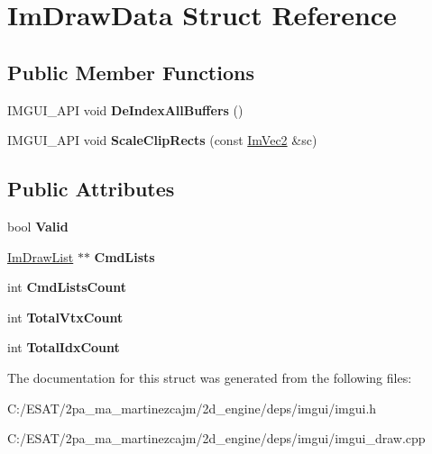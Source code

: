 \hypertarget{struct_im_draw_data}{}\section{Im\+Draw\+Data Struct Reference}
\label{struct_im_draw_data}
\subsection*{Public Member Functions}
\begin{DoxyCompactItemize}
\item 
\mbox{\label{struct_im_draw_data_a88ae746e958b79ee527fe94dee29d57c}} 
I\+M\+G\+U\+I\+\_\+\+A\+PI void {\bfseries De\+Index\+All\+Buffers} ()
\item 
\mbox{\label{struct_im_draw_data_abbfb7f8351b436da654f93b6f103f0e2}} 
I\+M\+G\+U\+I\+\_\+\+A\+PI void {\bfseries Scale\+Clip\+Rects} (const \hyperlink{struct_im_vec2}{Im\+Vec2} \&sc)
\end{DoxyCompactItemize}
\subsection*{Public Attributes}
\begin{DoxyCompactItemize}
\item 
\mbox{\label{struct_im_draw_data_ad01ab9ce5e8843b7860ccbb3eb9a6554}} 
bool {\bfseries Valid}
\item 
\mbox{\label{struct_im_draw_data_a9e93fe7e620eb2e9f61e3b689d617edc}} 
\hyperlink{struct_im_draw_list}{Im\+Draw\+List} $\ast$$\ast$ {\bfseries Cmd\+Lists}
\item 
\mbox{\label{struct_im_draw_data_adc0bbc2881c15f78bdabe51d82582f4e}} 
int {\bfseries Cmd\+Lists\+Count}
\item 
\mbox{\label{struct_im_draw_data_af0035b52cdf91932b25eaf2da853965a}} 
int {\bfseries Total\+Vtx\+Count}
\item 
\mbox{\label{struct_im_draw_data_a1ac8a5d441f464628295ef91a0602fc5}} 
int {\bfseries Total\+Idx\+Count}
\end{DoxyCompactItemize}


The documentation for this struct was generated from the following files\+:\begin{DoxyCompactItemize}
\item 
C\+:/\+E\+S\+A\+T/2pa\+\_\+ma\+\_\+martinezcajm/2d\+\_\+engine/deps/imgui/imgui.\+h\item 
C\+:/\+E\+S\+A\+T/2pa\+\_\+ma\+\_\+martinezcajm/2d\+\_\+engine/deps/imgui/imgui\+\_\+draw.\+cpp\end{DoxyCompactItemize}
